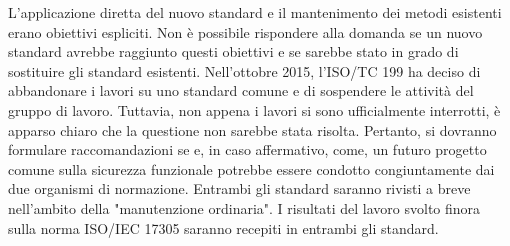 L'applicazione diretta del nuovo standard e il mantenimento dei metodi esistenti erano obiettivi espliciti. Non è possibile rispondere alla domanda se un nuovo standard avrebbe raggiunto questi obiettivi e se sarebbe stato in grado di sostituire gli standard esistenti. Nell'ottobre 2015, l'ISO/TC 199 ha deciso di abbandonare i lavori su uno standard comune e di sospendere le attività del gruppo di lavoro. Tuttavia, non appena i lavori si sono ufficialmente interrotti, è apparso chiaro che la questione non sarebbe stata risolta. Pertanto, si dovranno formulare raccomandazioni se e, in caso affermativo, come, un futuro progetto comune sulla sicurezza funzionale potrebbe essere condotto congiuntamente dai due organismi di normazione. Entrambi gli standard saranno rivisti a breve nell'ambito della "manutenzione ordinaria". I risultati del lavoro svolto finora sulla norma ISO/IEC 17305 saranno recepiti in entrambi gli standard.
\begin{center}
    \begin{minipage}{\textwidth}
        \centering
        \captionsetup{hypcap=false}
        \resizebox{0.92\textwidth}{!}{}
        \label{fig:03-03}
    \end{minipage}
\end{center}
